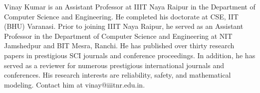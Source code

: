 \documentclass[journal]{IEEEtran}
\begin{document}
\begin{IEEEbiographynophoto}{Vinay Kumar}
is an Assistant Professor at IIIT Naya Raipur in the Department of Computer Science and Engineering.  He completed his doctorate at CSE, IIT (BHU) Varanasi. Prior to joining IIIT Naya Raipur, he served as an Assistant Professor in the Department of Computer Science and Engineering at NIT Jamshedpur and BIT Mesra, Ranchi. He has published over thirty research papers in prestigious SCI journals and conference proceedings. In addition, he has served as a reviewer for numerous prestigious international journals and conferences. His research interests are reliability, safety, and mathematical modeling. Contact him at vinay@iiitnr.edu.in.
\end{IEEEbiographynophoto}
\end{document}
